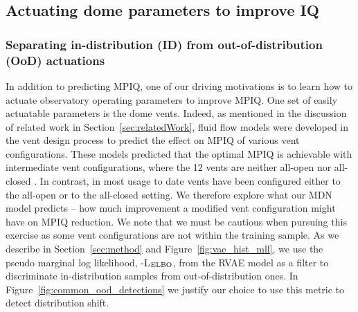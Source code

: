 \subsection{Actuating dome parameters to improve IQ}\label{sec:resultsImprovingIQ}
\subsubsection{Separating in-distribution (ID) from out-of-distribution (OoD) actuations}\label{sec:results_idvsood}
In addition to predicting MPIQ, one of our driving motivations is to learn how to actuate observatory operating parameters to improve MPIQ.  One set of easily actuatable parameters is the dome vents. Indeed, as mentioned in the discussion of related work in Section~\ref{sec:relatedWork}, fluid flow models were developed in the vent design process to predict the effect on MPIQ of various vent configurations. These models predicted that the optimal MPIQ is achievable with intermediate vent configurations, where the 12 vents are neither all-open nor all-closed \citep{wind_tunnel_test}.
In contrast, in most usage to date vents have been configured either to the all-open or to the all-closed setting. We therefore explore what our MDN model predicts -- how much improvement a modified vent configuration might have on MPIQ reduction. We note that we must be cautious when pursuing this exercise as some vent configurations are not within the training sample. As we describe in Section~\ref{sec:method} and Figure~\ref{fig:vae_hist_mll}, we use the pseudo marginal log likelihood, -L$_{\rm ELBO}$, from the RVAE model as a filter to discriminate in-distribution samples from out-of-distribution ones. In Figure~\ref{fig:common_ood_detections} we justify our choice to use this metric to detect distribution shift. 

